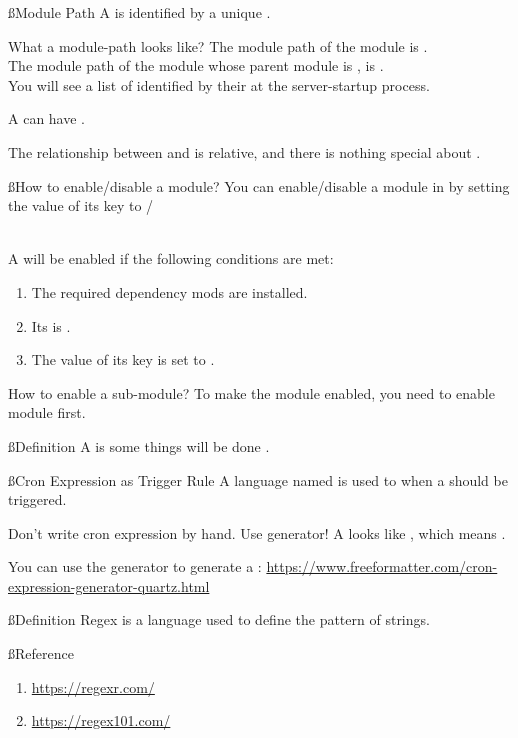 \ss{Module Path}
A  is identified by a unique .

\begin{example}{What a module-path looks like?}
    The module path of the module  is . \\
    The module path of the module  whose parent module is , is . \\
    You will see a list of  identified by their  at the server-startup process.
\end{example}

A  can have .

The relationship between  and  is relative, and there is nothing special about .

\ss{How to enable/disable a module?}
You can enable/disable a module in  by setting the value of its  key to /
\\
\\
\begin{samepage}
    A  will be enabled if the following conditions are met:
    \begin{enumerate}
        \item The required dependency mods are installed.
        \item Its  is .
        \item The value of its  key is set to .
    \end{enumerate}
\end{samepage}

\begin{example}{How to enable a sub-module?}
    To make the module  enabled, you need to enable  module first.
\end{example}


\clearpage
{}\label{sec:job}

\ss{Definition}
A  is some things will be done .

\ss{Cron Expression as Trigger Rule}
A language named  is used to  when a  should be triggered.

\begin{tips}{Don't write cron expression by hand. Use generator!}
    A  looks like , which means .

    You can use the generator to generate a :
    \url{https://www.freeformatter.com/cron-expression-generator-quartz.html}
\end{tips}

\clearpage
{}

\ss{Definition}
Regex is a language used to define the pattern of strings.

\ss{Reference}
\begin{enumerate}
    \item \url{https://regexr.com/}
    \item \url{https://regex101.com/}
\end{enumerate}




